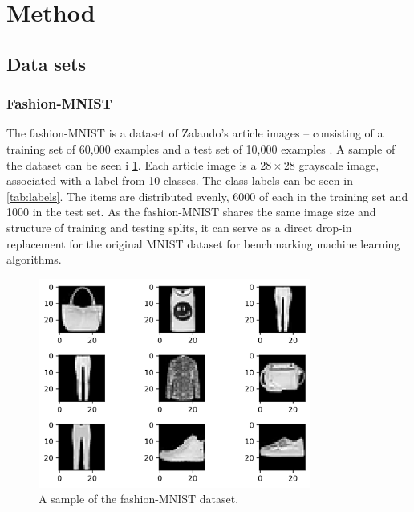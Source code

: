 \documentclass[../main.tex]{subfiles}
\begin{document}
\section{Method}
\subsection{Data sets}
\subsubsection{Fashion-MNIST}
The fashion-MNIST is a dataset of Zalando's article images -- consisting of a training set of 60,000 examples and a test set of 10,000 examples \cite{xiao2017/online}. A sample of the dataset can be seen i \cref{fig:ex_fashion_MNIST}. Each article image is a \ensuremath{28\times28} grayscale image, associated with a label from 10 classes. The class labels can be seen in \cref{tab:labels}. The items are distributed evenly, 6000 of each in the training set and 1000 in the test set. As the fashion-MNIST shares the same image size and structure of training and testing splits, it can serve as a direct drop-in replacement for the original MNIST dataset for benchmarking machine learning algorithms. 

\begin{figure}[!htb]
    \centering
    \includegraphics[width=0.8\textwidth]{fig/example_fashion_mnist.png}
    \caption{A sample of the fashion-MNIST dataset.}
    \label{fig:ex_fashion_MNIST}
\end{figure}
\end{document}
